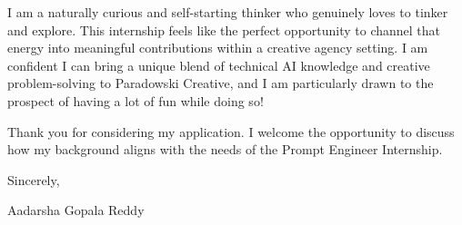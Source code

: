 \documentclass[10pt, letterpaper]{article}
\begin{document}
\vspace{\headerSpacing}
\begin{onecolentry}
    I am a naturally curious and self-starting thinker who genuinely loves to tinker and explore. This internship feels like the perfect opportunity to channel that energy into meaningful contributions within a creative agency setting. I am confident I can bring a unique blend of technical AI knowledge and creative problem-solving to Paradowski Creative, and I am particularly drawn to the prospect of having a lot of fun while doing so!
\end{onecolentry}

\vspace{\headerSpacing}
\begin{onecolentry}
    Thank you for considering my application. I welcome the opportunity to discuss how my background aligns with the needs of the Prompt Engineer Internship.
\end{onecolentry}

\vspace{\headerSpacing}
\begin{onecolentry}
    Sincerely,
\end{onecolentry}

\vspace{\headerSpacing}
\begin{onecolentry}
    Aadarsha Gopala Reddy\\
\end{onecolentry}
\end{document}
